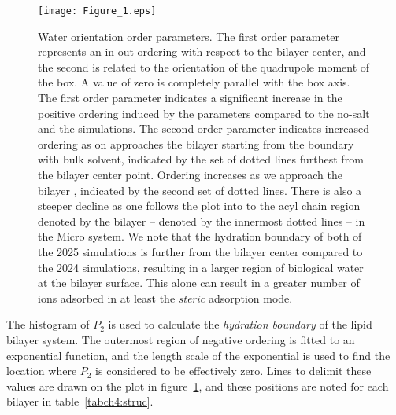 \begin{figure}[H]
    \caption[Water orientational order parameters]{Water orientation order parameters. The first
    order parameter represents an in-out ordering with respect to the bilayer center, and the second is related to the orientation of the quadrupole moment of the box. A value of zero is completely
    parallel with the box axis.  
    The first order parameter indicates a significant increase in the positive ordering induced by the  parameters compared to the no-salt and the
         simulations.  The second order parameter indicates increased ordering as on approaches the bilayer starting from the boundary with bulk solvent, indicated by the set of dotted lines
        furthest from the bilayer center point. Ordering increases as we approach the bilayer \dhh{}, indicated by the second set of dotted lines. There is also a steeper decline as one follows the plot into to the acyl chain region denoted by the bilayer \dc{} -- denoted by the innermost dotted lines --  in the
 Micro system. We note that the hydration boundary of both of the 2025 simulations is further from the bilayer center compared to the 2024 simulations, resulting in a larger region of biological water
at the bilayer surface. This alone can result in a greater number of ions adsorbed in at least the \emph{steric} adsorption mode.} 
    \label{figch4:h2order}
    \texttt{[image: Figure\_1.eps]}
\end{figure}
The histogram of $P_2$ is used to calculate the \emph{hydration boundary} of the lipid bilayer system. The outermost
region of negative ordering is fitted to an exponential function, and the length scale of the exponential is used to find the location where $P_2$ is considered to be effectively zero. 
Lines to delimit these values are drawn on the plot in figure~\ref{figch4:h2order}, and these positions are noted for each bilayer
in table~\ref{tabch4:struc}.
